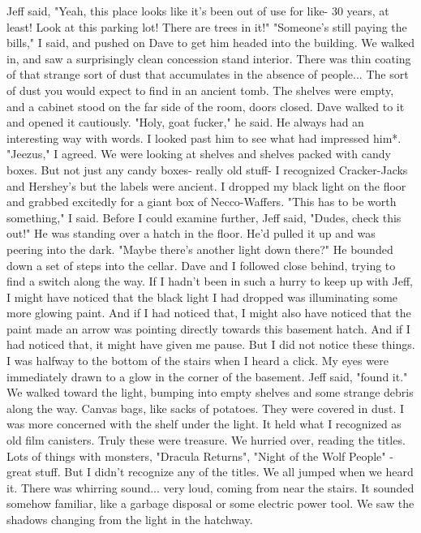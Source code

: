 \documentclass[a4paper]{article}
\begin{document}
Jeff said, "Yeah, this place looks like it's been out of use for like- 30 years, at least! Look at this parking lot! There are trees in it!"
"Someone's still paying the bills," I said, and pushed on Dave to get him headed into the building.
We walked in, and saw a surprisingly clean concession stand interior. There was thin coating of that strange sort of dust that accumulates in the absence of people... The sort of dust you would expect to find in an ancient tomb.
The shelves were empty, and a cabinet stood on the far side of the room, doors closed. Dave walked to it and opened it cautiously.
"Holy, goat fucker," he said. He always had an interesting way with words. I looked past him to see what had impressed him*.
"Jeezus," I agreed. We were looking at shelves and shelves packed with candy boxes. But not just any candy boxes- really old stuff- I recognized Cracker-Jacks and Hershey's but the labels were ancient.
I dropped my black light on the floor and grabbed excitedly for a giant box of Necco-Waffers. "This has to be worth something," I said.
Before I could examine further, Jeff said, "Dudes, check this out!"
He was standing over a hatch in the floor. He'd pulled it up and was peering into the dark. "Maybe there's another light down there?"
He bounded down a set of steps into the cellar. Dave and I followed close behind, trying to find a switch along the way.
If I hadn't been in such a hurry to keep up with Jeff, I might have noticed that the black light I had dropped was illuminating some more glowing paint. And if I had noticed that, I might also have noticed that the paint made an arrow was pointing directly towards this basement hatch. And if I had noticed that, it might have given me pause. But I did not notice these things.
I was halfway to the bottom of the stairs when I heard a click. My eyes were immediately drawn to a glow in the corner of the basement. Jeff said, "found it."
We walked toward the light, bumping into empty shelves and some strange debris along the way. Canvas bags, like sacks of potatoes. They were covered in dust. I was more concerned with the shelf under the light. It held what I recognized as old film canisters. Truly these were treasure.
We hurried over, reading the titles. Lots of things with monsters, "Dracula Returns", "Night of the Wolf People" - great stuff. But I didn't recognize any of the titles.
We all jumped when we heard it.
There was whirring sound... very loud, coming from near the stairs. It sounded somehow familiar, like a garbage disposal or some electric power tool. We saw the shadows changing from the light in the hatchway.
\end{document}
